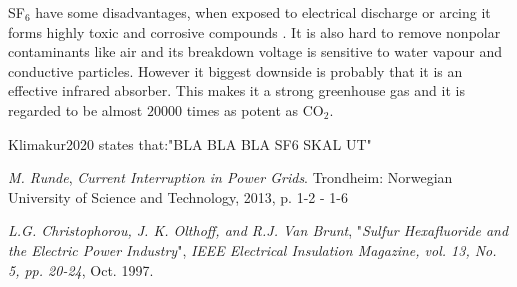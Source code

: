 \documentclass[10pt,a4paper]{article}
\begin{document}
SF$_6$ have some disadvantages, when exposed to electrical discharge or arcing it forms highly toxic and corrosive compounds \cite{bib:SF6PI}. It is also hard to remove nonpolar contaminants like air and its breakdown voltage is sensitive to water vapour and conductive particles. However it biggest downside is probably that it is an effective infrared absorber. This makes it a strong greenhouse gas \cite{bib:SF6PI} and it is regarded to be almost $20000$ times as potent as CO$_2$.

Klimakur2020 states that:"BLA BLA BLA SF6 SKAL UT"

\newpage

\begin{thebibliography}{10}


 \textit{M. Runde}, \textit{Current Interruption in Power Grids}. Trondheim: Norwegian University of Science and Technology, 2013, p. 1-2 - 1-6

 \textit{L.G. Christophorou, J. K. Olthoff, and R.J. Van Brunt}, "\textit{Sulfur Hexafluoride and the Electric Power Industry}", \textit{IEEE Electrical Insulation Magazine, vol. 13, No. 5, pp. 20-24}, Oct. 1997.

\end{thebibliography}
\end{document}
